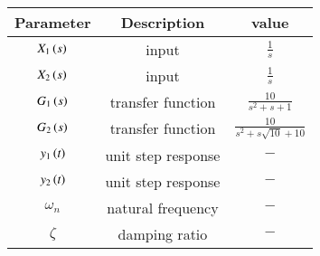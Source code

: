 \begin{tabular}{|c|c|c|}
	\hline
	\textbf{Parameter} &  \textbf{Description} & \textbf{value}\\[6pt]
	\hline
	$X_{1}\left(s\right)$ & input & $\frac{1}{s}$ \\[6pt]
	\hline
	$X_{2}\left(s\right)$ & input & $\frac{1}{s}$ \\[6pt]
	\hline
	$G_{1}\left(s\right)$ & transfer function & $\frac{10}{s^{2} + s + 1} $ \\[6pt]
	\hline
	$G_{2}\left(s\right)$ & transfer function & $\frac{10}{s^{2}+s\sqrt{10} +10} $ \\[6pt]
	\hline
	$y_{1}\left(t\right)$ & unit step response & $-$\\[6pt]
	\hline
	$y_{2}\left(t\right)$ & unit step response & $-$\\[6pt]
	\hline
	$\omega_{n}$ & natural frequency & $-$\\[6pt]
	\hline
	$\zeta$ & damping ratio & $-$\\[6pt]
	\hline 
	
\end{tabular}

